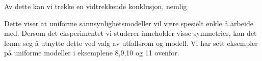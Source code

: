 \noindent Av dette kan vi trekke en vidtrekkende konklusjon, nemlig
\begin{center}  \end{center}
\noindent Dette viser at uniforme sannsynlighetsmodeller vil være spesielt
enkle å arbeide med. Dersom det eksperimentet vi studerer
inneholder visse symmetrier, kan det lønne seg å utnytte dette
ved valg av utfallsrom og modell. Vi har sett eksempler på
uniforme modeller i eksemplene 8,9,10 og 11 ovenfor.\\

